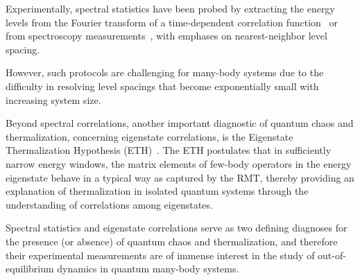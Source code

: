 \documentclass[aps,prx,reprint,twocolumn,superscriptaddress,floatfix,nofootinbib]{revtex4-2}
\begin{document}
Experimentally, spectral statistics have been probed by extracting the energy levels from the Fourier transform of a time-dependent correlation function~\cite{martinis2017spec} or from spectroscopy measurements~\cite{haq1982, frisch2014quantum, assmann2016quantum, zhou2010magnetic},
with emphases on nearest-neighbor level spacing.

However, such protocols are challenging for many-body systems due to the difficulty in resolving level spacings that become exponentially small with increasing system size.

Beyond spectral correlations, another important diagnostic of quantum chaos and thermalization, concerning eigenstate correlations, is the Eigenstate Thermalization Hypothesis (ETH)~\cite{deutsch1991quantum, Srednicki, Rigol2008}. The ETH postulates that in sufficiently narrow energy windows, the matrix elements of few-body operators in the energy eigenstate behave in a typical way as captured by the RMT, thereby providing an explanation of thermalization in isolated quantum systems through the understanding of correlations among eigenstates.

Spectral statistics and eigenstate correlations serve as two defining diagnoses for the presence (or absence) of quantum chaos and thermalization, and therefore their experimental measurements are of immense interest in the study of out-of-equilibrium dynamics in quantum many-body systems.
\end{document}
